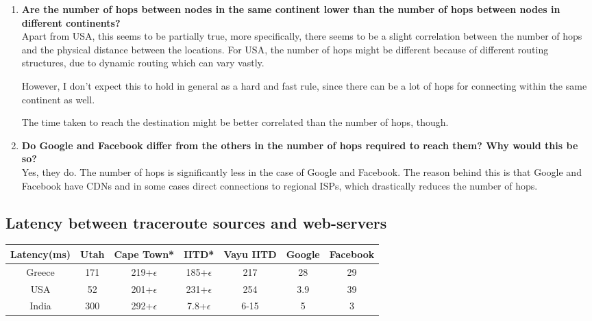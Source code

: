 \documentclass[a4paper]{article}
\newcommand{\nl}{\vspace{0.2cm}\\}
\begin{document}
\begin{enumerate}
    
    \item \textbf{Are the number of hops between nodes in the same continent lower than the number of hops between nodes in different continents?} \nl
        Apart from USA, this seems to be partially true, more specifically, there seems to be a slight correlation between the number of hops and the physical distance between the locations. For USA, the number of hops might be different because of different routing structures, due to dynamic routing which can vary vastly.

        However, I don't expect this to hold in general as a hard and fast rule, since there can be a lot of hops for connecting within the same continent as well.

        The time taken to reach the destination might be better correlated than the number of hops, though.

    \item \textbf{Do Google and Facebook differ from the others in the number of hops required to reach them? Why would this be so?}\nl
        Yes, they do. The number of hops is significantly less in the case of Google and Facebook. The reason behind this is that Google and Facebook have CDNs and in some cases direct connections to regional ISPs, which drastically reduces the number of hops.

\end{enumerate}

\subsection{Latency between traceroute sources and web-servers}

\begin{center}
    \begin{tabular}{|c|c|c|c|c|c|c|}
        \hline
        Latency(ms) & Utah  & Cape Town*        & IITD*             & Vayu IITD & Google    & Facebook  \\
        \hline
        Greece      & 171   & 219+$\epsilon$    & 185+$\epsilon$    &  217      & 28        & 29        \\
        \hline
        USA         & 52    & 201+$\epsilon$    & 231+$\epsilon$    &  254      & 3.9       & 39        \\
        \hline
        India       & 300   & 292+$\epsilon$    & 7.8+$\epsilon$    &  6-15     & 5         & 3         \\
        \hline
    \end{tabular}
\end{center}
\end{document}
